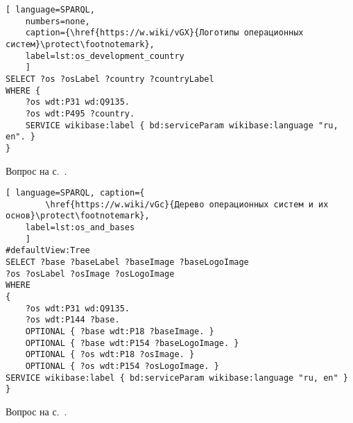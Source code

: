 \begin{task}
\label{answer:os_country}

\begin{lstlisting}[ language=SPARQL, 
    numbers=none,
    caption={\href{https://w.wiki/vGX}{Логотипы операционных систем}\protect\footnotemark},
	label=lst:os_development_country
	]
SELECT ?os ?osLabel ?country ?countryLabel
WHERE {
	?os wdt:P31 wd:Q9135.
	?os wdt:P495 ?country.
	SERVICE wikibase:label { bd:serviceParam wikibase:language "ru, en". }
}\end{lstlisting}

\small{Вопрос на с.~\pageref{tasks:operating_system_tasks}.}
\end{task}

\begin{task}
\label{answer:os_and_bases}

\begin{lstlisting}[ language=SPARQL, caption={
		\href{https://w.wiki/vGc}{Дерево операционных систем и их основ}\protect\footnotemark},
	label=lst:os_and_bases
	]
#defaultView:Tree
SELECT ?base ?baseLabel ?baseImage ?baseLogoImage
?os ?osLabel ?osImage ?osLogoImage
WHERE
{
	?os wdt:P31 wd:Q9135.
	?os wdt:P144 ?base.
	OPTIONAL { ?base wdt:P18 ?baseImage. }
	OPTIONAL { ?base wdt:P154 ?baseLogoImage. }
	OPTIONAL { ?os wdt:P18 ?osImage. }
	OPTIONAL { ?os wdt:P154 ?osLogoImage. }
SERVICE wikibase:label { bd:serviceParam wikibase:language "ru, en" }
}
\end{lstlisting}

\small{Вопрос на с.~\pageref{tasks:operating_system_tasks}.}
\end{task}


